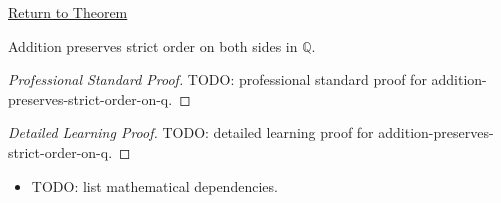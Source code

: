 \newpage
{}
\label{prf:addition-preserves-strict-order-on-q}

\begin{remark*}[Return]
\hyperref[thm:addition-preserves-strict-order-on-q]{Return to Theorem}
\end{remark*}

\begin{theorem*}
Addition preserves strict order on both sides in $\mathbb{Q}$.
\end{theorem*}

\begin{proof}[Professional Standard Proof]
\LRAProofBodyStart
TODO: professional standard proof for addition-preserves-strict-order-on-q.
\end{proof}

\begin{proof}[Detailed Learning Proof]
\LRAProofBodyStart
TODO: detailed learning proof for addition-preserves-strict-order-on-q.
\end{proof}

\begin{remark*}
\end{remark*}

\begin{dependencies}
\begin{itemize}
  \item TODO: list mathematical dependencies.
\end{itemize}
\end{dependencies}

\clearpage
